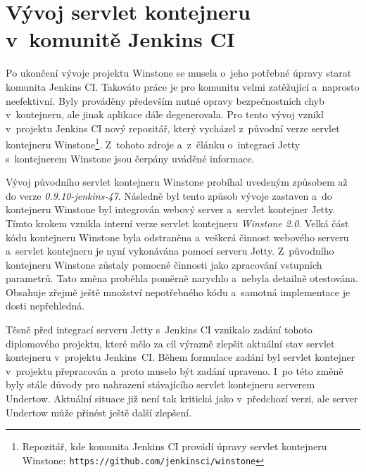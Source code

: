     \section{Vývoj servlet kontejneru v~komunitě Jenkins CI} \label{vyvojWinstone}
        Po ukončení vývoje projektu Winstone se musela o~jeho potřebné úpravy starat komunita
        Jenkins CI. Takováto práce je pro komunitu velmi zatěžující
        a~naprosto neefektivní. Byly prováděny především nutné opravy bezpečnostních chyb v~kontejneru,
        ale jinak aplikace dále degenerovala. Pro tento vývoj vznikl v~projektu Jenkins CI nový 
        repozitář, který vycházel z~původní verze servlet kontejneru 
        Winstone\footnote{Repozitář, kde komunita Jenkins CI provádí úpravy servlet kontejneru Winstone:
        \texttt{https://github.com/jenkinsci/winstone}}. Z~tohoto zdroje
        a~z~článku o~integraci Jetty s~kontejnerem Winstone \cite{kohsukeTopic} jsou čerpány uváděné informace. 
        
        \medskip
        Vývoj původního servlet kontejneru Winstone probíhal uvedeným způsobem 
        až do verze \emph{0.9.10-jenkins-47}. Následně byl tento způsob vývoje zastaven
        a~do kontejneru Winstone byl integrován webový server a~servlet kontejner
        Jetty. Tímto krokem vznikla 
        interní verze servlet kontejneru \emph{Winstone 2.0}. Velká část kódu 
        kontejneru Winstone byla odstraněna a~veškerá činnost webového serveru a~servlet 
        kontejneru je nyní vykonávána pomocí serveru Jetty. Z~původního kontejneru Winstone
        zůstaly pomocné činnosti jako zpracování vstupních parametrů.
        Tato změna proběhla poměrně narychlo
        a~nebyla detailně otestována. Obsahuje zřejmě ještě množství nepotřebného kódu
        a~samotná implementace je dosti nepřehledná.

        
        \medskip
        Těsně před integrací serveru Jetty s~Jenkins CI
        vznikalo zadání tohoto diplomového projektu, které mělo za cíl
        výrazně zlepšit aktuální stav servlet kontejneru v~projektu Jenkins~CI. Během
        formulace zadání byl servlet kontejner v~projektu přepracován a~proto
        muselo být zadání upraveno. I~po této změně byly stále důvody pro 
        nahrazení stávajícího servlet kontejneru serverem Undertow.
        Aktuální situace již není tak kritická jako v~předchozí verzi,
        ale server Undertow může přinést ještě další zlepšení.
                

